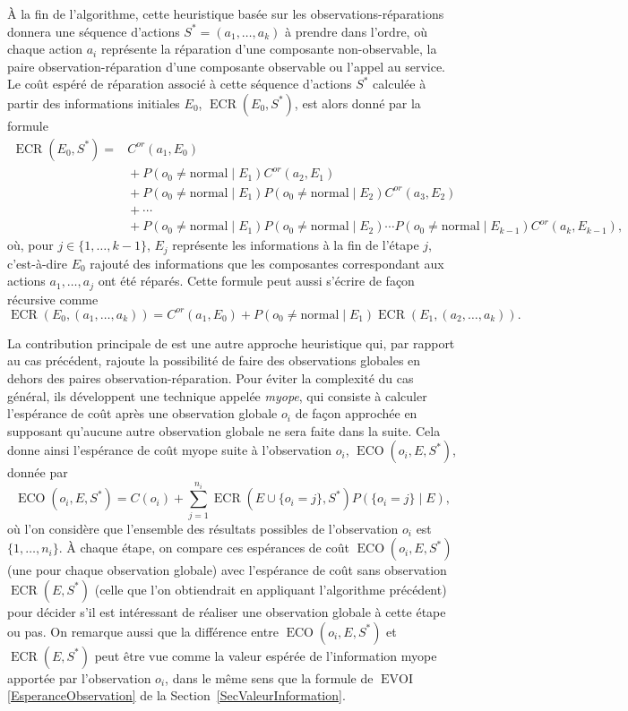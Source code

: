 \documentclass[a4paper,11pt]{article}
\theoremstyle{plain}
\DeclareMathOperator{\ECO}{ECO}
\DeclareMathOperator{\ECR}{ECR}
\DeclareMathOperator{\EVOI}{EVOI}
\begin{document}
À la fin de l'algorithme, cette heuristique basée sur les observations-réparations donnera une séquence d'actions $S^\ast = (a_1, \dotsc, a_k)$ à prendre dans l'ordre, où chaque action $a_i$ représente la réparation d'une composante non-observable, la paire observation-réparation d'une composante observable ou l'appel au service. Le coût espéré de réparation associé à cette séquence d'actions $S^\ast$ calculée à partir des informations initiales $E_0$, $\ECR(E_0, S^\ast)$, est alors donné par la formule
\begin{equation}
\label{EqECR}
\begin{aligned}
\ECR(E_0, S^\ast) = {} & C^{or}(a_1, E_0) \\
& {} + P(o_0 \neq \text{normal} \mid E_1) C^{or}(a_2, E_1) \\
& {} + P(o_0 \neq \text{normal} \mid E_1) P(o_0 \neq \text{normal} \mid E_2) C^{or}(a_3, E_2) \\
& {} + \dotsb \\
& {} + P(o_0 \neq \text{normal} \mid E_1) P(o_0 \neq \text{normal} \mid E_2) \dotsm P(o_0 \neq \text{normal} \mid E_{k-1}) C^{or}(a_k, E_{k-1}),
\end{aligned}
\end{equation}
où, pour $j \in \{1, \dotsc, k-1\}$, $E_j$ représente les informations à la fin de l'étape $j$, c'est-à-dire $E_0$ rajouté des informations que les composantes correspondant aux actions $a_1, \dotsc, a_j$ ont été réparés. Cette formule peut aussi s'écrire de façon récursive comme
\[
\ECR(E_0, (a_1, \dotsc, a_k)) = C^{or}(a_1, E_0) + P(o_0 \neq \text{normal} \mid E_1) \ECR(E_1, (a_2, \dotsc, a_k)).
\]

La contribution principale de \cite{heckerman1994troubleshooting, Heckerman_1995} est une autre approche heuristique qui, par rapport au cas précédent, rajoute la possibilité de faire des observations globales en dehors des paires ob\-ser\-va\-tion-ré\-pa\-ra\-tion. Pour éviter la complexité du cas général, ils développent une technique appelée \emph{myope}, qui consiste à calculer l'espérance de coût après une observation globale $o_i$ de façon approchée en supposant qu'aucune autre observation globale ne sera faite dans la suite. Cela donne ainsi l'espérance de coût myope suite à l'observation $o_i$, $\ECO(o_i, E, S^\ast)$, donnée par
\[
\ECO(o_i, E, S^\ast) = C(o_i) + \sum_{j=1}^{n_i} \ECR(E \cup \{o_i = j\}, S^\ast) P(\{o_i = j\} \mid E),
\]
où l'on considère que l'ensemble des résultats possibles de l'observation $o_i$ est $\{1, \dotsc, n_i\}$. À chaque étape, on compare ces espérances de coût $\ECO(o_i, E, S^\ast)$ (une pour chaque observation globale) avec l'espérance de coût sans observation $\ECR(E, S^\ast)$ (celle que l'on obtiendrait en appliquant l'algorithme précédent) pour décider s'il est intéressant de réaliser une observation globale à cette étape ou pas. On remarque aussi que la différence entre $\ECO(o_i, E, S^\ast)$ et $\ECR(E, S^\ast)$ peut être vue comme la valeur espérée de l'information myope apportée par l'observation $o_i$, dans le même sens que la formule de $\EVOI$ \eqref{EsperanceObservation} de la Section~\ref{SecValeurInformation}.
\end{document}
